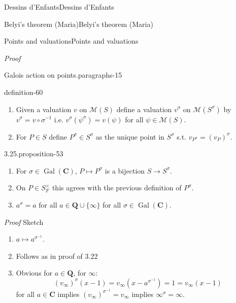 \documentclass[10pt,]{book}
\makeatletter
\renewcommand*{\proofname}{Proof}
\renewenvironment{proof}[1][\proofname]{\par
  \pushQED{\qed}%
  \normalfont \topsep6\p@\@plus6\p@\relax
  \trivlist
  \item\relax
    {\itshape
    #1\@addpunct{.}}\hspace\labelsep\ignorespaces
}{%
  \popQED\endtrivlist\@endpefalse
}
\numberwithin{equation}{section}
\newcommand{\QQ}{\mathbf{Q}}
\newcommand{\CC}{\mathbf{C}}
\makeatother
\begin{document}
\begin{chapterptx}{Dessins d'Enfants}{}{Dessins d'Enfants}{}{}
\begin{sectionptx}{Belyi's theorem (Maria)}{}{Belyi's theorem (Maria)}{}{}
\begin{subsectionptx}{Points and valuations}{}{Points and valuations}{}{}
\begin{proof}
\end{proof}
\begin{paragraphs}{Galois action on points.}{paragraphs-15}%
\begin{definition}{}{definition-60}%
\hypertarget{p-624}{}%
\leavevmode%
\begin{enumerate}
\item\hypertarget{li-125}{}Given a valuation \(v\) on \(\mathcal M(S)\) define a valuation \(v^\sigma\) on \(\mathcal M(S^\sigma)\) by \(v^\sigma = v\circ \sigma^{-1}\) i.e. \(v^\sigma(\psi^\sigma) = v(\psi)\) for all \(\psi \in \mathcal M(S)\).%
\item\hypertarget{li-126}{}For \(P \in S\) define \(P^\sigma \in S^\sigma\) as the unique point in \(S^\sigma\) s.t. \(v_{P^\sigma} = (v_P)^\sigma\).%
\end{enumerate}
%
\end{definition}
\begin{proposition}{3.25.}{}{proposition-53}%
\hypertarget{p-625}{}%
\leavevmode%
\begin{enumerate}
\item\hypertarget{li-127}{}For \(\sigma\in \operatorname{Gal}(\CC)\), \(P\mapsto P^\sigma\) is a bijection \(S\to S^\sigma\).%
\item\hypertarget{li-128}{}On \(P \in S_F^\times\) this agrees with the previous definition of \(P^\sigma\).%
\item\hypertarget{li-129}{}\(a^\sigma = a\) for all \(a\in \QQ \cup \{\infty\}\) for all \(\sigma \in \operatorname{Gal}(\CC)\).%
\end{enumerate}
%
\end{proposition}
\begin{proof}\hypertarget{proof-94}{}
\hypertarget{p-626}{}%
Sketch\leavevmode%
\begin{enumerate}
\item\hypertarget{li-130}{}\(a \mapsto a^{\sigma^{-1}}\).%
\item\hypertarget{li-131}{}Follows as in proof of 3.22%
\item\hypertarget{li-132}{}Obvious for \(a \in \QQ\), for \(\infty\):%
\begin{equation*}
(v_\infty)^\sigma (x-1) = v_\infty(x- a^{\sigma^{-1}}) = 1 = v_\infty(x-1)
\end{equation*}
for all \(a\in \CC\) implies \((v_\infty)^{\sigma^{-1}} = v_\infty\) implies \(\infty^\sigma  = \infty\).%
\end{enumerate}
%
\end{proof}
\end{paragraphs}%

\end{subsectionptx}
\end{sectionptx}
\end{chapterptx}
\end{document}
